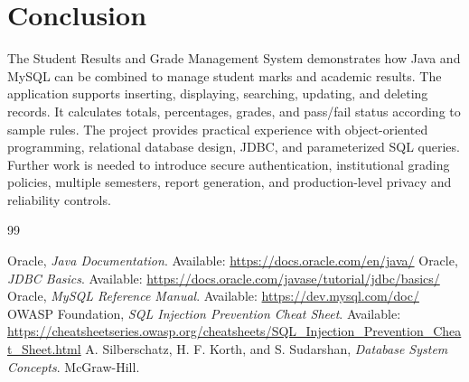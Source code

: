 \documentclass[11pt,a4paper]{report}
\begin{document}
\section{Conclusion}
The Student Results and Grade Management System demonstrates how Java and MySQL can be combined to manage student marks and academic results. The application supports inserting, displaying, searching, updating, and deleting records. It calculates totals, percentages, grades, and pass/fail status according to sample rules. The project provides practical experience with object-oriented programming, relational database design, JDBC, and parameterized SQL queries. Further work is needed to introduce secure authentication, institutional grading policies, multiple semesters, report generation, and production-level privacy and reliability controls.

\begin{thebibliography}{99}
 Oracle, \textit{Java Documentation}. Available: \url{https://docs.oracle.com/en/java/}
 Oracle, \textit{JDBC Basics}. Available: \url{https://docs.oracle.com/javase/tutorial/jdbc/basics/}
 Oracle, \textit{MySQL Reference Manual}. Available: \url{https://dev.mysql.com/doc/}
 OWASP Foundation, \textit{SQL Injection Prevention Cheat Sheet}. Available: \url{https://cheatsheetseries.owasp.org/cheatsheets/SQL_Injection_Prevention_Cheat_Sheet.html}
 A. Silberschatz, H. F. Korth, and S. Sudarshan, \textit{Database System Concepts}. McGraw-Hill.
\end{thebibliography}
\end{document}
